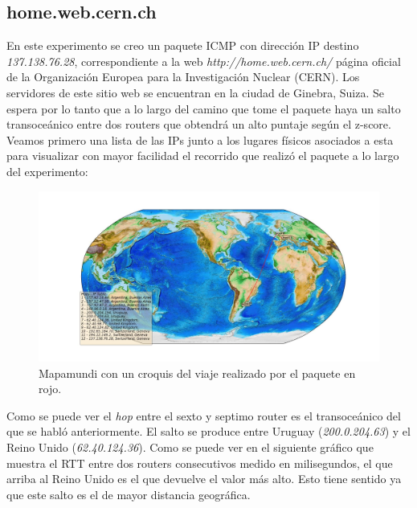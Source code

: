 \subsection{home.web.cern.ch}

En este experimento se creo un paquete ICMP con dirección IP destino \textit{137.138.76.28}, correspondiente a la web \textit{http://home.web.cern.ch/} página oficial de la Organización Europea para la Investigación Nuclear (CERN). Los servidores de este sitio web se encuentran en la ciudad de Ginebra, Suiza. Se espera por lo tanto que a lo largo del camino que tome el paquete haya un salto transoceánico entre dos routers que obtendrá un alto puntaje según el z-score. Veamos primero una lista de las IPs junto a los lugares físicos asociados a esta para visualizar con mayor facilidad el recorrido que realizó el paquete a lo largo del experimento:

\begin{figure}[H]
  \centering	
	\includegraphics[scale=0.3]{../cern-experiment/figure_1.jpeg}
  \caption{Mapamundi con un croquis del viaje realizado por el paquete en rojo.}
	\label{fig:histo-src-sitiotrabajo}
\end{figure}

Como se puede ver el \textit{hop} entre el sexto y septimo router es el transoceánico del que se habló anteriormente. El salto se produce entre Uruguay (\textit{200.0.204.63}) y el Reino Unido (\textit{62.40.124.36}). Como se puede ver en el siguiente gráfico que muestra el RTT entre dos routers consecutivos medido en milisegundos, el que arriba al Reino Unido es el que devuelve el valor más alto. Esto tiene sentido ya que este salto es el de mayor distancia geográfica.

